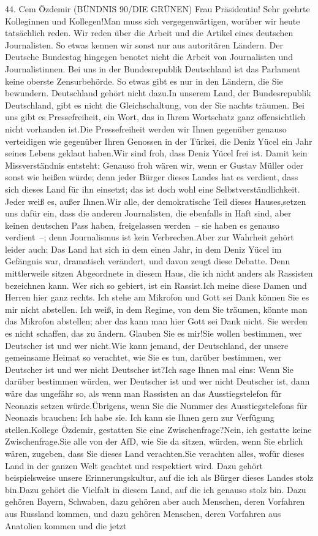 \documentclass{article}
\begin{document}
	44. Cem Özdemir (BÜNDNIS 90/DIE GRÜNEN) Frau Präsidentin! Sehr geehrte Kolleginnen und Kollegen!Man muss sich vergegenwärtigen, worüber wir heute tatsächlich reden. Wir reden über die Arbeit und die Artikel eines deutschen Journalisten. So etwas kennen wir sonst nur aus autoritären Ländern. Der Deutsche Bundestag hingegen benotet nicht die Arbeit von Journalisten und Journalistinnen. Bei uns in der Bundesrepublik Deutschland ist das Parlament keine oberste Zensurbehörde. So etwas gibt es nur in den Ländern, die Sie bewundern. Deutschland gehört nicht dazu.In unserem Land, der Bundesrepublik Deutschland, gibt es nicht die Gleichschaltung, von der Sie nachts träumen. Bei uns gibt es Pressefreiheit, ein Wort, das in Ihrem Wortschatz ganz offensichtlich nicht vorhanden ist.Die Pressefreiheit werden wir Ihnen gegenüber genauso verteidigen wie gegenüber Ihren Genossen in der Türkei, die Deniz Yücel ein Jahr seines Lebens geklaut haben.Wir sind froh, dass Deniz Yücel frei ist. Damit kein Missverständnis entsteht: Genauso froh wären wir, wenn er Gustav Müller oder sonst wie heißen würde; denn jeder Bürger dieses Landes hat es verdient, dass sich dieses Land für ihn einsetzt; das ist doch wohl eine Selbstverständlichkeit. Jeder weiß es, außer Ihnen.Wir alle, der demokratische Teil dieses Hauses,setzen uns dafür ein, dass die anderen Journalisten, die ebenfalls in Haft sind, aber keinen deutschen Pass haben, freigelassen werden – sie haben es genauso verdient –; denn Journalismus ist kein Verbrechen.Aber zur Wahrheit gehört leider auch: Das Land hat sich in dem einen Jahr, in dem Deniz Yücel im Gefängnis war, dramatisch verändert, und davon zeugt diese Debatte. Denn mittlerweile sitzen Abgeordnete in diesem Haus, die ich nicht anders als Rassisten bezeichnen kann. Wer sich so gebiert, ist ein Rassist.Ich meine diese Damen und Herren hier ganz rechts. Ich stehe am Mikrofon und Gott sei Dank können Sie es mir nicht abstellen. Ich weiß, in dem Regime, von dem Sie träumen, könnte man das Mikrofon abstellen; aber das kann man hier Gott sei Dank nicht. Sie werden es nicht schaffen, das zu ändern. Glauben Sie es mir!Sie wollen bestimmen, wer Deutscher ist und wer nicht.Wie kann jemand, der Deutschland, der unsere gemeinsame Heimat so verachtet, wie Sie es tun, darüber bestimmen, wer Deutscher ist und wer nicht Deutscher ist?Ich sage Ihnen mal eins: Wenn Sie darüber bestimmen würden, wer Deutscher ist und wer nicht Deutscher ist, dann wäre das ungefähr so, als wenn man Rassisten an das Ausstiegstelefon für Neonazis setzen würde.Übrigens, wenn Sie die Nummer des Ausstiegstelefons für Neonazis brauchen: Ich habe sie. Ich kann sie Ihnen gern zur Verfügung stellen.Kollege Özdemir, gestatten Sie eine Zwischenfrage?Nein, ich gestatte keine Zwischenfrage.Sie alle von der AfD, wie Sie da sitzen, würden, wenn Sie ehrlich wären, zugeben, dass Sie dieses Land verachten.Sie verachten alles, wofür dieses Land in der ganzen Welt geachtet und respektiert wird. Dazu gehört beispielsweise unsere Erinnerungskultur, auf die ich als Bürger dieses Landes stolz bin.Dazu gehört die Vielfalt in diesem Land, auf die ich genauso stolz bin. Dazu gehören Bayern, Schwaben, dazu gehören aber auch Menschen, deren Vorfahren aus Russland kommen, und dazu gehören Menschen, deren Vorfahren aus Anatolien kommen und die jetzt 
\end{document}

